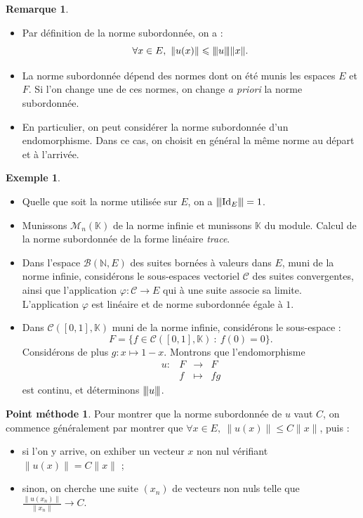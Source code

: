 \documentclass[french]{article}
\newcommand{\N}{\mathbb{N}}
\newcommand{\K}{\mathbb{K}}
\newcommand{\vertiii}[1]{{\left\vert\kern-0.25ex\left\vert\kern-0.25ex\left\vert #1 \right\vert\kern-0.25ex\right\vert\kern-0.25ex\right\vert}}
\theoremstyle{plain}
\theoremstyle{definition}
\newtheorem*{ex}{Exemple}
\newtheorem*{met}{Point méthode}
\newtheorem*{rmq}{Remarque}
\theoremstyle{remark}
\begin{document}
\begin{rmq}
	\begin{itemize}
		\item Par définition de la norme subordonnée, on a : $$\forall x\in E,\ \lVert u(x)\rVert\leqslant\vertiii{u}\lVert x\rVert.$$
		\item La norme subordonnée dépend des normes dont on été munis les espaces $E$ et $F$. Si l'on change une de ces normes, on change \textit{a priori} la norme subordonnée.
		\item En particulier, on peut considérer la norme subordonnée d'un endomorphisme. Dans ce cas, on choisit en général la même norme au départ et à l'arrivée.
	\end{itemize}
\end{rmq}

\begin{ex}
	\begin{itemize}
		\item Quelle que soit la norme utilisée sur $E$, on a $\vertiii{\text{Id}_E}=1$.
		\item Munissons $\mathcal{M}_n(\K)$ de la norme infinie et munissons $\K$ du module. Calcul de la norme subordonnée de la forme linéaire \textit{trace}.
		\item Dans l'espace $\mathcal{B}(\N,E)$ des suites bornées à valeurs dans $E$, muni de la norme infinie, considérons le sous-espaces vectoriel $\mathcal{C}$ des suites convergentes, ainsi que l'application $\varphi:\mathcal{C}\to E$ qui à une suite associe sa limite. L'application $\varphi$ est linéaire et de norme subordonnée égale à $1$.
		\item Dans $\mathcal{C}([0,1],\K)$ muni de la norme infinie, considérons le sous-espace : $$F=\{f\in\mathcal{C}([0,1],\K)\ :\ f(0)=0\}.$$ Considérons de plus $g:x\mapsto 1-x$. Montrons que l'endomorphisme $$\begin{array}{lrcl}
			u:&F&\longrightarrow&F\\
			&f&\longmapsto&fg
		\end{array}$$ est continu, et déterminons $\vertiii{u}$.
	\end{itemize}
\end{ex}

\begin{met}
	Pour montrer que la norme subordonnée de $u$ vaut $C$, on commence généralement par montrer que $\forall x\in E,\ \lVert u(x)\rVert\leqslant C\lVert x\rVert$, puis :
	\begin{itemize}
		\item si l'on y arrive, on exhiber un vecteur $x$ non nul vérifiant $\lVert u(x)\rVert=C\lVert x\rVert$ ;
		\item sinon, on cherche une suite $(x_n)$ de vecteurs non nuls telle que $\displaystyle\frac{\lVert u(x_n)\rVert}{\lVert x_n\rVert}\to C$.
	\end{itemize}
\end{met}
\end{document}
